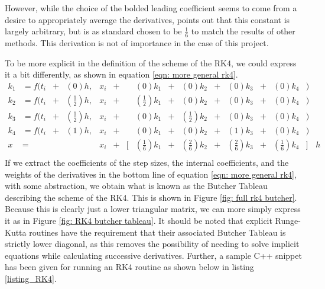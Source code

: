 \documentclass[onecolumn,titlepage,letterpaper,10pt]{article}
\begin{document}
However, while the choice of the bolded leading coefficient seems to come
from a desire to
appropriately average the derivatives, \citet{holmes_2018} points out that
this constant is largely arbitrary, but is as standard chosen to be
$\frac{1}{6}$ to match the results of other methods. This derivation is not of
importance in the case of this project.

To be more explicit in the definition of the scheme of the RK4, we could express
it a bit differently, as shown in equation \eqref{eqn: more general rk4}.
\begin{equation}
\begin{aligned}
	k_1 &= f(t_i & + &(          0)h, &x_i& + & &           (0)k_1& + &           (0)k_2& + &           (0)k_3& + &           (0)k_4&)&\\
    k_2 &= f(t_i & + &(\frac{1}{2})h, &x_i& + & & (\frac{1}{2})k_1& + &           (0)k_2& + &           (0)k_3& + &           (0)k_4&)&\\
    k_3 &= f(t_i & + &(\frac{1}{2})h, &x_i& + & &           (0)k_1& + & (\frac{1}{2})k_2& + &           (0)k_3& + &           (0)k_4&)&\\
    k_4 &= f(t_i & + &(          1)h, &x_i& + & &           (0)k_1& + &           (0)k_2& + &           (1)k_3& + &           (0)k_4&)&\\
	x   &=       &   &                &x_i& + &[& (\frac{1}{6})k_1& + & (\frac{2}{6})k_2& + & (\frac{2}{6})k_3& + & (\frac{1}{6})k_4 &]&h\\
    \label{eqn: more general rk4}
\end{aligned}
\end{equation}
If we extract the coefficients of the step sizes, the internal
coefficients, and the weights of the derivatives in the bottom line of equation
\eqref{eqn: more general rk4}, with some abstraction, we obtain what is known
as the Butcher Tableau describing the scheme of the RK4. This is shown in Figure
\ref{fig: full rk4 butcher}. Because this is clearly just a lower triangular
matrix, we can more simply express it as in Figure \ref{fig: RK4 butcher tableau}.
It should be noted that explicit Runge-Kutta routines have the requirement
that their associated Butcher Tableau is strictly lower diagonal, as this removes
the possibility of
needing to solve implicit equations while calculating successive derivatives.
Further, a sample C++ snippet has been given for running an RK4 routine as
shown below in listing \ref{listing_RK4}.
\end{document}
